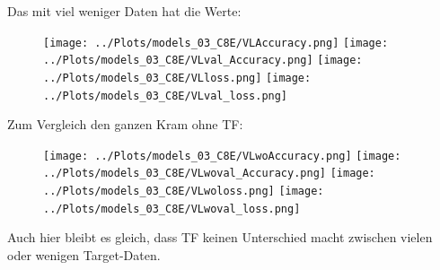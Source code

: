     Das mit viel weniger Daten hat die Werte: 
    \begin{figure}[htpb]
        \texttt{[image: ../Plots/models\_03\_C8E/VLAccuracy.png]}
        \texttt{[image: ../Plots/models\_03\_C8E/VLval\_Accuracy.png]}
        \texttt{[image: ../Plots/models\_03\_C8E/VLloss.png]}
        \texttt{[image: ../Plots/models\_03\_C8E/VLval\_loss.png]}
    \end{figure}

    Zum Vergleich den ganzen Kram ohne TF: 
    \begin{figure}[htpb]
        \texttt{[image: ../Plots/models\_03\_C8E/VLwoAccuracy.png]}
        \texttt{[image: ../Plots/models\_03\_C8E/VLwoval\_Accuracy.png]}
        \texttt{[image: ../Plots/models\_03\_C8E/VLwoloss.png]}
        \texttt{[image: ../Plots/models\_03\_C8E/VLwoval\_loss.png]}
    \end{figure}
    Auch hier bleibt es gleich, dass TF keinen Unterschied macht zwischen vielen oder wenigen 
    Target-Daten. 
